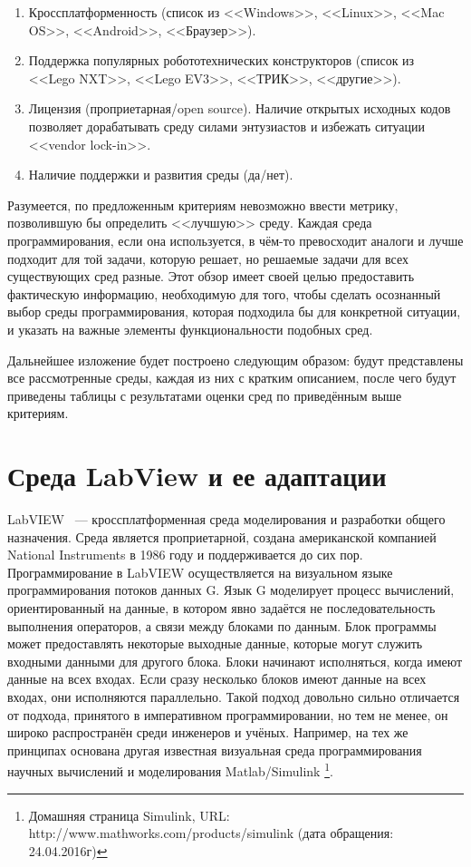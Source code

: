 \documentclass[a5paper]{article}
\begin{document}
\begin{enumerate}
    \begin{enumerate}
        \item Кроссплатформенность (список из <<Windows>>, <<Linux>>, <<Mac OS>>, <<Android>>, <<Браузер>>).
        \item Поддержка популярных робототехнических конструкторов (список из <<Lego NXT>>, <<Lego EV3>>, 
                <<ТРИК>>, <<другие>>).
        \item Лицензия (проприетарная/open source). Наличие открытых исходных кодов позволяет дорабатывать 
                среду силами энтузиастов и избежать ситуации <<vendor lock-in>>.
        \item Наличие поддержки и развития среды (да/нет).
    \end{enumerate}
\end{enumerate}

Разумеется, по предложенным критериям невозможно ввести метрику, позволившую бы определить <<лучшую>> среду. 
Каждая среда программирования, если она используется, в чём-то превосходит аналоги и лучше подходит для той 
задачи, которую решает, но решаемые задачи для всех существующих сред разные. Этот обзор имеет своей целью 
предоставить фактическую информацию, необходимую для того, чтобы сделать осознанный выбор среды 
программирования, которая подходила бы для конкретной ситуации, и указать на важные элементы функциональности 
подобных сред.

Дальнейшее изложение будет построено следующим образом: будут представлены все рассмотренные среды, 
каждая из них с кратким описанием, после чего будут приведены таблицы с результатами оценки сред 
по приведённым выше критериям.

\section{Среда LabView и ее адаптации}

LabVIEW~\cite{kodosky1991visual} --- кроссплатформенная среда моделирования и разработки общего назначения. 
Среда является проприетарной, 
создана американской компанией National Instruments в 1986 году и поддерживается до сих пор. Программирование 
в LabVIEW осуществляется на визуальном языке программирования потоков данных G. Язык G моделирует процесс 
вычислений, ориентированный на данные, в котором явно задаётся не последовательность выполнения операторов, 
а связи между блоками по данным. Блок программы может предоставлять некоторые выходные данные, которые могут 
служить входными данными для другого блока. Блоки начинают исполняться, когда имеют данные на всех входах. 
Если сразу несколько блоков имеют данные на всех входах, они исполняются параллельно. Такой подход довольно 
сильно отличается от подхода, принятого в императивном программировании, но тем не менее, он широко 
распространён среди инженеров и учёных. Например, на тех же принципах основана другая известная визуальная 
среда программирования научных вычислений и моделирования Matlab/Simulink%
\footnote{Домашняя страница Simulink, URL: http://www.mathworks.com/products/simulink (дата обращения: 24.04.2016г)}.
\end{document}
